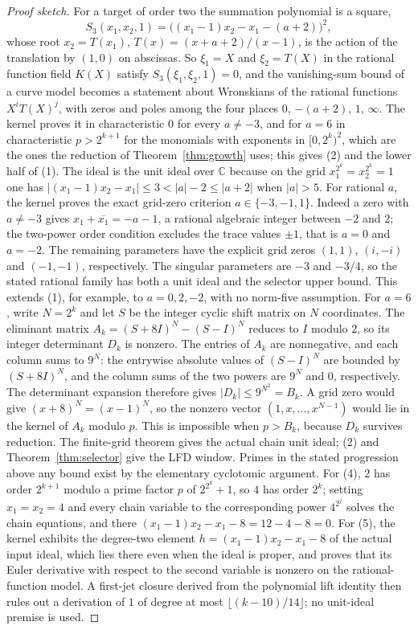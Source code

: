 \documentclass[11pt]{article}
\theoremstyle{definition}\newtheorem{definition}[theorem]{Definition}
\theoremstyle{remark}\newtheorem{remark}[theorem]{Remark}
\begin{document}
\begin{proof}[Proof sketch]
For a target of order two the summation polynomial is a square,
\[
 S_3(x_1,x_2,1)=\bigl((x_1-1)x_2-x_1-(a+2)\bigr)^2 ,
\]
whose root $x_2=T(x_1)$, $T(x)=(x+a+2)/(x-1)$, is the action of the
translation by $(1,0)$ on abscissas. So $\xi_1=X$ and $\xi_2=T(X)$ in the
rational function field $K(X)$ satisfy $S_3(\xi_1,\xi_2,1)=0$, and the
vanishing-sum bound of a curve model becomes a statement about Wronskians
of the rational functions $X^iT(X)^j$, with zeros and poles among the four
places $0$, $-(a+2)$, $1$, $\infty$. The kernel proves it in
characteristic $0$ for every $a\ne-3$, and for $a=6$ in characteristic
$p>2^{k+1}$ for the monomials with exponents in $[0,2^k)^2$, which are the
ones the reduction of Theorem~\ref{thm:growth} uses; this gives (2) and the
lower half of (1). The ideal is the unit ideal over $\mathbb{C}$ because on
the grid $x_1^{2^k}=x_2^{2^k}=1$ one has
$|(x_1-1)x_2-x_1|\le3<|a|-2\le|a+2|$ when $|a|>5$.
For rational $a$, the kernel proves the exact grid-zero criterion
$a\in\{-3,-1,1\}$. Indeed a zero with $a\ne-3$ gives
$x_1+\overline{x_1}=-a-1$, a rational algebraic integer between $-2$ and
$2$; the two-power order condition excludes the trace values $\pm1$, that is
$a=0$ and $a=-2$.
The remaining parameters have the explicit grid zeros $(1,1)$, $(i,-i)$
and $(-1,-1)$, respectively. The singular parameters are $-3$ and $-3/4$,
so the stated rational family has both a unit ideal and the selector upper
bound. This extends (1), for example, to $a=0,2,-2$, with no norm-five
assumption. For $a=6$, write $N=2^k$ and let $S$ be the integer cyclic
shift matrix on $N$ coordinates. The eliminant matrix
$A_k=(S+8I)^N-(S-I)^N$ reduces to $I$ modulo $2$, so its integer
 determinant $D_k$ is nonzero. The entries of $A_k$ are nonnegative, and each column sums to $9^N$: the
entrywise absolute values of $(S-I)^N$ are bounded by $(S+8I)^N$,
and the column sums of the two powers are $9^N$ and $0$, respectively.
The determinant expansion therefore gives $|D_k|\le9^{N^2}=B_k$.
A grid zero would give $(x+8)^N=(x-1)^N$, so the nonzero vector
$(1,x,\ldots,x^{N-1})$ would lie in the kernel of $A_k$ modulo $p$.
This is impossible when $p>B_k$, because $D_k$ survives reduction. The
finite-grid theorem gives the actual chain unit ideal; (2) and
Theorem~\ref{thm:selector} give the LFD window. Primes in the stated
progression above any bound exist by the elementary cyclotomic argument.
For (4), $2$ has order $2^{k+1}$ modulo a
prime factor $p$ of $2^{2^k}+1$, so $4$ has order $2^k$; setting
$x_1=x_2=4$ and every chain variable to the corresponding power $4^{2^j}$
solves the chain equations, and there $(x_1-1)x_2-x_1-8=12-4-8=0$.
For (5), the kernel exhibits the degree-two element
$h=(x_1-1)x_2-x_1-8$ of the actual input ideal, which lies there even when
the ideal is proper, and proves that its Euler derivative with respect to
the second variable is nonzero on the rational-function model. A first-jet
closure derived from the polynomial lift identity then rules out a
derivation of $1$ of degree at most $\lfloor(k-10)/14\rfloor$; no
unit-ideal premise is used.
\end{proof}
\end{document}
